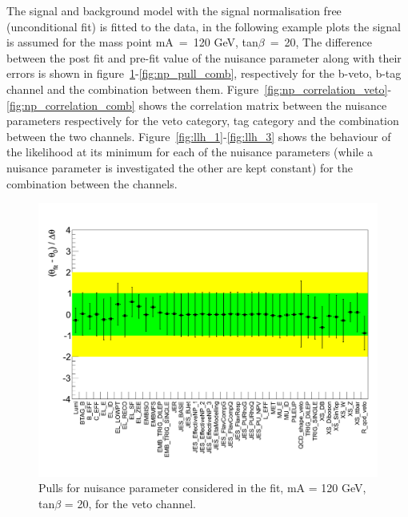 The signal and background model with the signal normalisation free (unconditional fit) is fitted to the data,
in the following example plots the signal is assumed for the mass point mA~=~120 GeV, tan$\beta$~=~20,  
The difference between the post fit and pre-fit value of the nuisance parameter along with their errors is shown in figure~\ref{fig:np_pull_veto}-\ref{fig:np_pull_comb},
respectively for the b-veto, b-tag channel and the combination between them.
Figure~\ref{fig:np_correlation_veto}-\ref{fig:np_correlation_comb} shows the correlation matrix between the nuisance parameters respectively for
the veto category, tag category and the combination between the two channels.
Figure~\ref{fig:llh_1}-\ref{fig:llh_3} shows the behaviour of the likelihood at its minimum for 
each of the nuisance parameters (while a nuisance parameter is investigated the other are kept constant) for the combination between the channels.

\begin{figure}[htp]
     \begin{center}

            \includegraphics[width=\textwidth]{figure/np_check/pull_veto.png}
    \end{center}
    \caption{ Pulls for nuisance parameter considered in the fit,  mA = 120 GeV, tan$\beta$ = 20, for the veto channel.} 
    \label{fig:np_pull_veto}
\end{figure}


